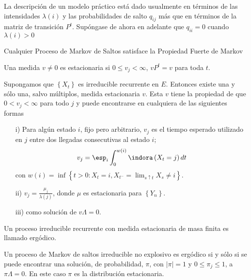 La descripci\'on de un modelo pr\'actico est\'a dado usualmente en t\'erminos de las intensidades $\lambda\left(i\right)$ y las probabilidades de salto $q_{ij}$ m\'as que en t\'erminos de la matriz de transici\'on $P^{t}$. Sup\'ongase de ahora en adelante que $q_{ii}=0$ cuando $\lambda\left(i\right)>0$

\begin{Teo}
Cualquier Proceso de Markov de Saltos satisface la Propiedad
Fuerte de Markov
\end{Teo}

\begin{Def}
Una medida $v\neq0$ es estacionaria si $0\leq v_{j}<\infty$, $vP^{t}=v$ para toda $t$.
\end{Def}

\begin{Teo}\label{Teo.4.2}
Supongamos que $\left\{X_{t}\right\}$ es irreducible recurrente en $E$. Entonces existe una y s\'olo una, salvo m\'ultiplos, medida estacionaria $v$. Esta $v$ tiene la propiedad de que $0<v_{j}<\infty$ para todo $j$ y puede encontrarse en cualquiera de las siguientes formas

\begin{itemize}
\item[i)] Para alg\'un estado $i$, fijo pero arbitrario, $v_{j}$ es el tiempo esperado utilizado en $j$ entre dos llegadas consecutivas al estado $i$;
\begin{equation}\label{Eq.4.2}
v_{j}=\esp_{i}\int_{0}^{w\left(i\right)}\indora\left(X_{t}=j\right)dt
\end{equation}
con $w\left(i\right)=\inf\left\{t>0:X_{t}=i,X_{t^{-}}=\lim_{s\uparrow t}X_{s}\neq i\right\}$. 
\item[ii)]
$v_{j}=\frac{\mu_{j}}{\lambda\left(j\right)}$, donde $\mu$ es estacionaria para $\left\{Y_{n}\right\}$. \item[iii)] como
soluci\'on de $v\Lambda=0$.
\end{itemize}
\end{Teo}

\begin{Def}
Un proceso irreducible recurrente con medida estacionaria de masa
finita es llamado erg\'odico.
\end{Def}

\begin{Teo}\label{Teo.4.3}
Un proceso de Markov de saltos irreducible no explosivo es erg\'odico si y s\'olo si se puede encontrar una soluci\'on, de probabilidad, $\pi$, con $|\pi|=1$ y $0\leq\pi_{j}\leq1$, a $\pi\Lambda=0$. En este caso $\pi$ es la distribuci\'on estacionaria.
\end{Teo}

